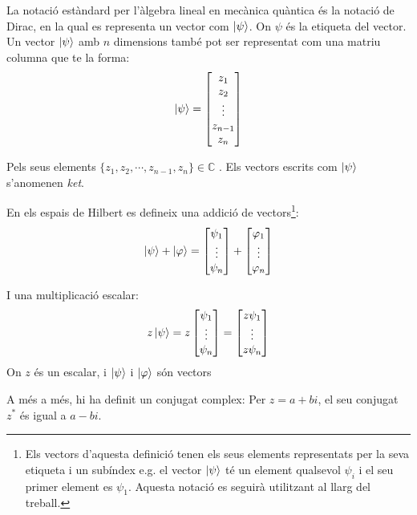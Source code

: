La notació estàndard per l'àlgebra lineal en mecànica quàntica és la notació de Dirac, en la qual es representa un vector com $ \ket{\psi} $. On $\psi$ és la etiqueta del vector. Un vector $ \ket{\psi} $ amb $n$ dimensions també pot ser representat com una matriu columna que te la forma: 
$$
\ket{\psi} = 
\begin{bmatrix}
	z_{1} \\
	z_{2} \\
	\vdots \\
	z_{n-1} \\
	z_{n}
\end{bmatrix}
$$

Pels seus elements $\{z_{1}, z_{2}, \cdots , z_{n-1}, z_{n}\} \in \mathbb{C}$ . Els vectors escrits com $\ket{\psi}$ s'anomenen \textit{ket}.

En els espais de Hilbert es defineix una addició de vectors\footnote{Els vectors d'aquesta definició tenen els seus elements representats per la seva etiqueta i un subíndex e.g. el vector $\ket{\psi}$ té un element qualsevol $\psi_{i}$ i el seu primer element es $\psi_{1}$. Aquesta notació es seguirà utilitzant al llarg del treball.}:
$$
\ket{\psi} + \ket{\varphi} = \begin{bmatrix} \psi_{1} \\ \vdots \\ \psi_{n} \end{bmatrix} +
\begin{bmatrix} \varphi_{1} \\ \vdots \\ \varphi_{n} \end{bmatrix}
$$

I una multiplicació escalar:
$$
  z\ket{\psi} = z\begin{bmatrix} \psi_{1} \\ \vdots \\ \psi_{n} \end{bmatrix} = \begin{bmatrix} z \psi_{1} \\ \vdots \\ z \psi_{n} \end{bmatrix}
$$
On $z$ és un escalar, i $\ket{\psi}$ i $\ket{\varphi}$ són vectors

A més a més, hi ha definit un conjugat complex: Per $z=a +bi$, el seu conjugat $z^*$ és igual a $a-bi$. 

